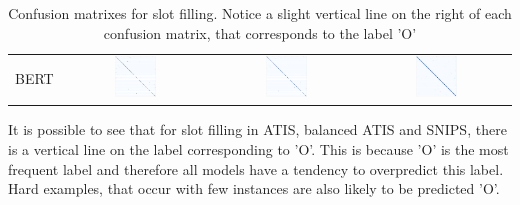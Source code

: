 \documentclass[a4paper]{article}
\begin{document}
\begin{table}[h!]
\begin{adjustbox}{max width=\textwidth}
\begin{tabular}{l|ccc}
			BERT &  \includegraphics[width=0.3\textwidth]{"../assets/images/confusion matrixes/CM_BERT_slot_ATIS_labeless"} & \includegraphics[width=0.3\textwidth]{"../assets/images/confusion matrixes/CM_BERT_slot_remix_ATIS_labeless"} &\includegraphics[width=0.3\textwidth]{"../assets/images/confusion matrixes/CM_BERT_slot_SNIPS_labeless"} \\
		\end{tabular}
	\end{adjustbox}

\caption{Confusion matrixes for slot filling. Notice a slight vertical line on the right of each confusion matrix, that corresponds to the label 'O'}
\label{fig:cm_slot}
\end{table}

It is possible to see that for slot filling in ATIS, balanced ATIS and SNIPS, there is a vertical line on the label corresponding to 'O'. This is because 'O' is the most frequent label and therefore all models have a tendency to overpredict this label. Hard examples, that occur with few instances are also likely to be predicted 'O'. 
\end{document}
